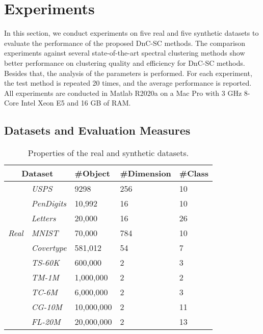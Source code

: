 \section{Experiments}
\label{sec:experiment}

In this section, we conduct experiments on five real and five synthetic datasets to evaluate the performance of the proposed DnC-SC methods.
The comparison experiments against several state-of-the-art spectral clustering methods show better performance on clustering quality and efficiency for DnC-SC methods.
Besides that, the analysis of the parameters is performed.
For each experiment, the test method is repeated 20 times, and the average performance is reported.
All experiments are conducted in Matlab R2020a on a Mac Pro with 3 GHz 8-Core Intel Xeon E5 and 16 GB of RAM.

\subsection{Datasets and Evaluation Measures}

\begin{table}[!t]
  \centering
  \caption{Properties of the real and synthetic datasets.}
  \label{table:datasets}
  \begin{center}
    \begin{tabular}{p{1.2cm}<{\centering}|p{1.3cm}<{\centering}|p{1.5cm}<{\centering}p{1.2cm}<{\centering}p{1.2cm}<{\centering}}
      \toprule
      \multicolumn{2}{c|}{Dataset}         &\#Object     &\#Dimension      &\#Class\\
      \midrule
                                        & \emph{USPS}      & 9298       & 256 & 10 \\
      \multirow{5}{*}{\emph{Real}}      & \emph{PenDigits} & 10,992     & 16  & 10 \\
                                        & \emph{Letters}   & 20,000     & 16  & 26 \\
                                        & \emph{MNIST}     & 70,000     & 784 & 10 \\
                                        & \emph{Covertype} & 581,012    & 54  & 7  \\
      \midrule
      \multirow{5}{*}{\emph{Synthetic}} & \emph{TS-60K}    & 600,000    & 2   & 3  \\
                                        & \emph{TM-1M}     & 1,000,000  & 2   & 2  \\
                                        & \emph{TC-6M}     & 6,000,000  & 2   & 3  \\
                                        & \emph{CG-10M}    & 10,000,000 & 2   & 11 \\
                                        & \emph{FL-20M}    & 20,000,000 & 2   & 13 \\
      \bottomrule
    \end{tabular}
  \end{center}
\end{table}


